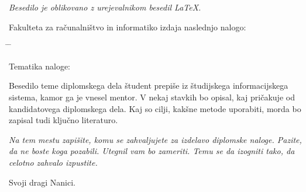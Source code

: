 \documentclass[a4paper, 12pt]{book}
\newcommand{\clearemptydoublepage}{\newpage{\pagestyle{empty}\cleardoublepage}}
\begin{document}
\begin{center}
\mbox{}\vfill
\emph{Besedilo je oblikovano z urejevalnikom besedil \LaTeX.}
\end{center}
\clearemptydoublepage

\thispagestyle{empty}
\vspace*{4cm}

\noindent
Fakulteta za računalništvo in informatiko izdaja naslednjo nalogo:
\medskip
\begin{tabbing}
\hspace{32mm}\= \hspace{6cm} \= \kill




Tematika naloge:
\end{tabbing}
Besedilo teme diplomskega dela študent prepiše iz študijskega informacijskega sistema, kamor ga je vnesel mentor. V nekaj stavkih bo opisal, kaj pričakuje od kandidatovega diplomskega dela. Kaj so cilji, kakšne metode uporabiti, morda bo zapisal tudi ključno literaturo.
\vspace{15mm}






\vspace{2cm}

\clearemptydoublepage

\thispagestyle{empty}\mbox{}\vfill\null\it%
\noindent
Na tem mestu zapišite, komu se zahvaljujete za izdelavo diplomske naloge. Pazite, da ne boste koga pozabili. Utegnil vam bo zameriti. Temu se da izogniti tako, da celotno zahvalo izpustite.
\rm\normalfont

\clearemptydoublepage

\thispagestyle{empty}\mbox{}{\textheight}\mbox{}\hfill\begin{minipage}{0.55\textwidth}%
Svoji dragi Nanici.
\normalfont\end{minipage}

\clearemptydoublepage


\pagestyle{empty}
\def\thepage{}%
\tableofcontents{}



\clearemptydoublepage
\end{document}
